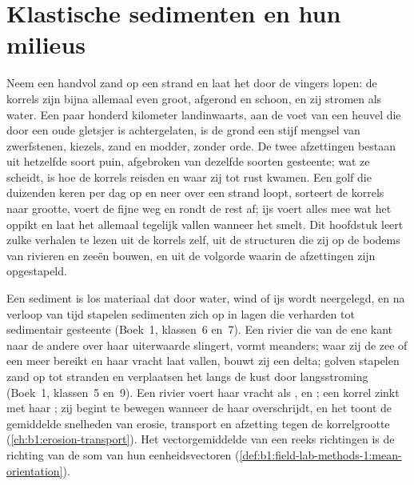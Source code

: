 \chapter{Klastische sedimenten en hun milieus}\label{ch:b1:clastic-sediments}

Neem een handvol zand op een strand en laat het door de vingers lopen: de korrels zijn bijna allemaal even groot, afgerond en schoon, en zij stromen als water. Een paar honderd kilometer landinwaarts, aan de voet van een heuvel die door een oude gletsjer is achtergelaten, is de grond een stijf mengsel van zwerfstenen, kiezels, zand en modder, zonder orde. De twee afzettingen bestaan uit hetzelfde soort puin, afgebroken van dezelfde soorten gesteente; wat ze scheidt, is hoe de korrels reisden en waar zij tot rust kwamen. Een golf die duizenden keren per dag op en neer over een strand loopt, sorteert de korrels naar grootte, voert de fijne weg en rondt de rest af; ijs voert alles mee wat het oppikt en laat het allemaal tegelijk vallen wanneer het smelt. Dit hoofdstuk leert zulke verhalen te lezen uit de korrels zelf, uit de structuren die zij op de bodems van rivieren en zeeën bouwen, en uit de volgorde waarin de afzettingen zijn opgestapeld.

\begin{recall}
Een sediment is los materiaal dat door water, wind of ijs wordt neergelegd, en na verloop van tijd stapelen sedimenten zich op in lagen die verharden tot sedimentair gesteente (Boek~1, klassen~6 en~7). Een rivier die van de ene kant naar de andere over haar uiterwaarde slingert, vormt meanders; waar zij de zee of een meer bereikt en haar vracht laat vallen, bouwt zij een delta; golven stapelen zand op tot stranden en verplaatsen het langs de kust door langsstroming (Boek~1, klassen~5 en~9). Een rivier voert haar vracht als ,  en ; een korrel zinkt met haar ; zij begint te bewegen wanneer de  haar  overschrijdt, en het  toont de gemiddelde snelheden van erosie, transport en afzetting tegen de korrelgrootte (\cref{ch:b1:erosion-transport}). Het vectorgemiddelde van een reeks richtingen is de richting van de som van hun eenheidsvectoren (\cref{def:b1:field-lab-methods-1:mean-orientation}).
\end{recall}

